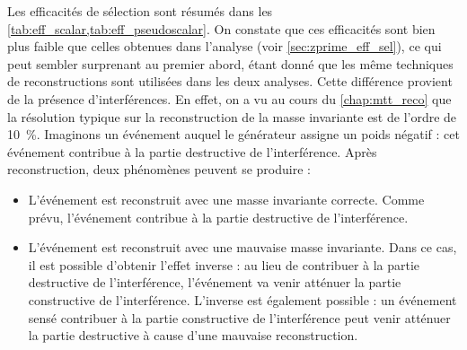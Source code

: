 Les efficacités de sélection sont résumés dans les \cref{tab:eff_scalar,tab:eff_pseudoscalar}. On constate que ces efficacités sont bien plus faible que celles obtenues dans l'analyse \zprime (voir \cref{sec:zprime_eff_sel}), ce qui peut sembler surprenant au premier abord, étant donné que les même techniques de reconstructions sont utilisées dans les deux analyses. Cette différence provient de la présence d'interférences. En effet, on a vu au cours du \cref{chap:mtt_reco} que la résolution typique sur la reconstruction de la masse invariante \mtt est de l'ordre de \SI{10}{\percent}. Imaginons un événement auquel le générateur assigne un poids négatif : cet événement contribue à la partie destructive de l'interférence. Après reconstruction, deux phénomènes peuvent se produire :
\begin{itemize}
    \item L'événement est reconstruit avec une masse invariante correcte. Comme prévu, l'événement contribue à la partie destructive de l'interférence.
    \item L'événement est reconstruit avec une mauvaise masse invariante. Dans ce cas, il est possible d'obtenir l'effet inverse : au lieu de contribuer à la partie destructive de l'interférence, l'événement va venir atténuer la partie constructive de l'interférence. L'inverse est également possible : un événement sensé contribuer à la partie constructive de l'interférence peut venir atténuer la partie destructive à cause d'une mauvaise reconstruction.
\end{itemize}

